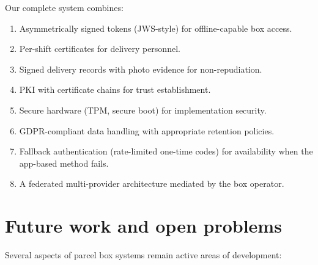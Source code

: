 Our complete system combines:
\begin{enumerate}
  \item Asymmetrically signed tokens (JWS-style) for offline-capable
    box access.
  \item Per-shift certificates for delivery personnel.
  \item Signed delivery records with photo evidence for non-repudiation.
  \item \ac{PKI} with certificate chains for trust establishment.
  \item Secure hardware (\ac{TPM}, secure boot) for implementation
    security.
  \item \ac{GDPR}-compliant data handling with appropriate retention
    policies.
  \item Fallback authentication (rate-limited one-time codes) for
    availability when the app-based method fails.
  \item A federated multi-provider architecture mediated by the box
    operator.
\end{enumerate}


\section{Future work and open problems}\label{ParcelFutureWork}


Several aspects of parcel box systems remain active areas of development:

